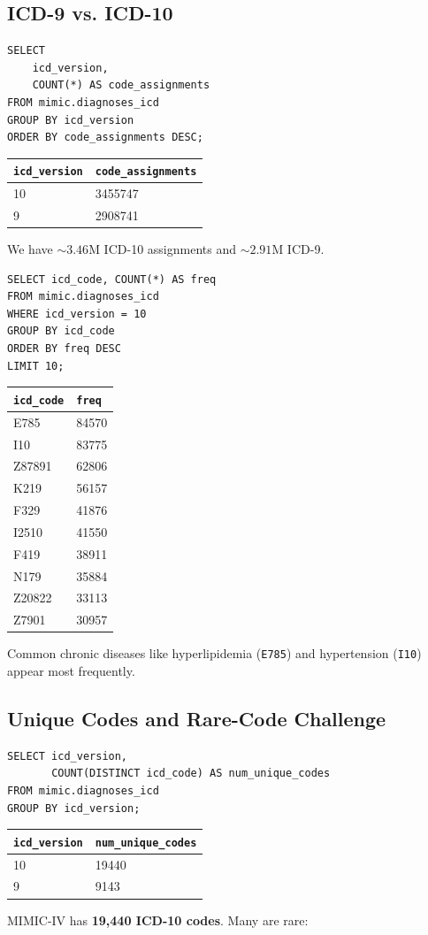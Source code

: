 \subsection{ICD-9 vs. ICD-10}
\begin{verbatim}
SELECT
    icd_version,
    COUNT(*) AS code_assignments
FROM mimic.diagnoses_icd
GROUP BY icd_version
ORDER BY code_assignments DESC;
\end{verbatim}
\begin{center}
\begin{tabular}{l|l}
\hline
\texttt{icd\_version} & \texttt{code\_assignments} \\
\hline
10 & 3455747 \\
9  & 2908741 \\
\hline
\end{tabular}
\end{center}
We have \(\sim3.46\)M ICD-10 assignments and \(\sim2.91\)M ICD-9.

\begin{verbatim}
SELECT icd_code, COUNT(*) AS freq
FROM mimic.diagnoses_icd
WHERE icd_version = 10
GROUP BY icd_code
ORDER BY freq DESC
LIMIT 10;
\end{verbatim}
\begin{center}
\begin{tabular}{l|l}
\hline
\texttt{icd\_code} & \texttt{freq} \\
\hline
E785   & 84570  \\
I10    & 83775  \\
Z87891 & 62806  \\
K219   & 56157  \\
F329   & 41876  \\
I2510  & 41550  \\
F419   & 38911  \\
N179   & 35884  \\
Z20822 & 33113  \\
Z7901  & 30957  \\
\hline
\end{tabular}
\end{center}
Common chronic diseases like hyperlipidemia (\texttt{E785}) and hypertension (\texttt{I10}) appear most frequently.

\subsection{Unique Codes and Rare-Code Challenge}
\begin{verbatim}
SELECT icd_version,
       COUNT(DISTINCT icd_code) AS num_unique_codes
FROM mimic.diagnoses_icd
GROUP BY icd_version;
\end{verbatim}
\begin{center}
\begin{tabular}{l|l}
\hline
\texttt{icd\_version} & \texttt{num\_unique\_codes} \\
\hline
10 & 19440 \\
9  & 9143  \\
\hline
\end{tabular}
\end{center}
MIMIC-IV has \textbf{19,440 ICD-10 codes}. Many are rare:


